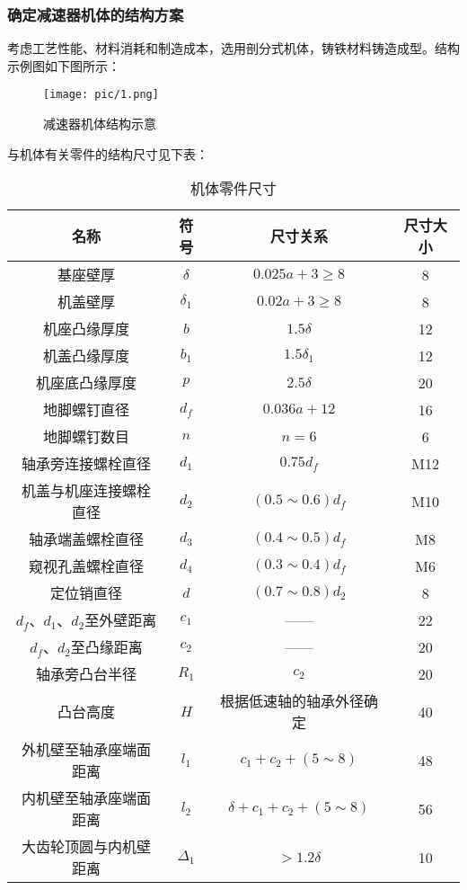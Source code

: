 \subsubsection{确定减速器机体的结构方案}
考虑工艺性能、材料消耗和制造成本，选用剖分式机体，铸铁材料铸造成型。结构示例图如下图所示：
\begin{figure}[H]
	\begin{center}
		\texttt{[image: pic/1.png]}
		\caption{减速器机体结构示意}
	\end{center}
\end{figure}
\par 与机体有关零件的结构尺寸见下表：
\begin{table}[H]
	\caption{机体零件尺寸}
	\begin{center}
		\begin{tabular}{cccc}
			\toprule
			名称 & 符号	& 尺寸关系 & 尺寸大小 \\
			\midrule
			基座壁厚 & $\delta$ & $0.025a+3\geq 8$ & 8 \\
			机盖壁厚 & $\delta_1$ & $0.02a+3\geq 8$ & 8 \\
			机座凸缘厚度 & $b$ & $1.5\delta$ & 12 \\
			机盖凸缘厚度 & $b_1$ & $1.5\delta_1$ & 12 \\
			机座底凸缘厚度 & $p$ & $2.5\delta$ & 20 \\
			地脚螺钉直径 & $d_f$ & $0.036a+12$ & 16 \\
			地脚螺钉数目 & $n$ & $n=6$ & 6 \\
			轴承旁连接螺栓直径 & $d_1$ & $0.75d_f$ &M12\\
			机盖与机座连接螺栓直径 & $d_2$ & $(0.5\sim 0.6) d_f$ &M10\\
			轴承端盖螺栓直径 & $d_3$ & $(0.4\sim 0.5)d_f$ &M8\\
			窥视孔盖螺栓直径 & $d_4$ & $(0.3\sim 0.4)d_f$ &M6\\
			定位销直径 & $d$ & $(0.7\sim 0.8)d_2$ & 8\\
			$d_f$、$d_1$、$d_2$至外壁距离 & $c_1$ & —— & 22\\
			$d_f$、$d_2$至凸缘距离 & $c_2$ & —— & 20\\	
			轴承旁凸台半径& $R_1$ & $c_2$ & 20 \\
			凸台高度 & $H$ & 根据低速轴的轴承外径确定 & 40\\
			外机壁至轴承座端面距离 & $l_1$ & $c_1+c_2+(5\sim 8)$ & 48\\
			内机壁至轴承座端面距离 & $l_2$ & $\delta+c_1+c_2+(5\sim 8)$ & 56\\
			大齿轮顶圆与内机壁距离 & $\Delta_1$ & $>1.2\delta$ & 10\\

\end{tabular}
\end{center}
\end{table}

